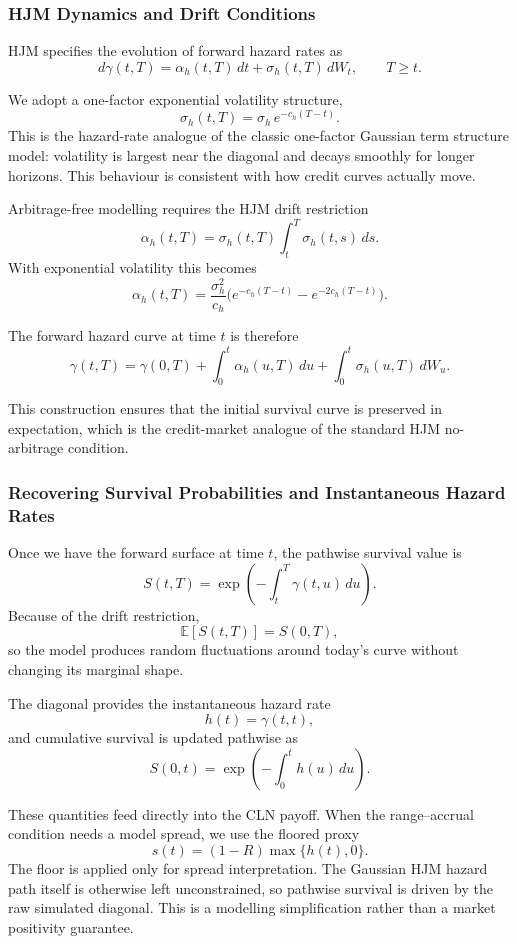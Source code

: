 \subsubsection*{HJM Dynamics and Drift Conditions}

HJM specifies the evolution of forward hazard rates as
\[
d\gamma(t,T)
= \alpha_h(t,T)\,dt + \sigma_h(t,T)\,dW_t,
\qquad T \ge t.
\]

We adopt a one-factor exponential volatility structure,
\[
\sigma_h(t,T) = \sigma_h\, e^{-c_h(T - t)}.
\]
This is the hazard-rate analogue of the classic one-factor Gaussian term
structure model: volatility is largest near the diagonal and decays smoothly for
longer horizons. This behaviour is consistent with how credit curves actually
move.

Arbitrage-free modelling requires the HJM drift restriction
\[
\alpha_h(t,T)
= \sigma_h(t,T)\int_t^T \sigma_h(t,s)\,ds.
\]
With exponential volatility this becomes
\[
\alpha_h(t,T)
  = \frac{\sigma_h^2}{c_h}\big(e^{-c_h(T - t)} - e^{-2c_h(T - t)}\big).
\]

The forward hazard curve at time $t$ is therefore
\[
\gamma(t,T)
= \gamma(0,T)
  + \int_0^t \alpha_h(u,T)\,du
  + \int_0^t \sigma_h(u,T)\,dW_u.
\]

This construction ensures that the initial survival curve is preserved in
expectation, which is the credit-market analogue of the standard HJM
no-arbitrage condition.

\subsubsection*{Recovering Survival Probabilities and Instantaneous Hazard Rates}

Once we have the forward surface at time $t$, the pathwise survival value is
\[
S(t,T)
  = \exp\!\left(-\int_t^T \gamma(t,u)\,du\right).
\]
Because of the drift restriction,
\[
\mathbb{E}\!\left[S(t,T)\right] = S(0,T),
\]
so the model produces random fluctuations around today’s curve without changing
its marginal shape.

The diagonal provides the instantaneous hazard rate
\[
h(t) = \gamma(t,t),
\]
and cumulative survival is updated pathwise as
\[
S(0,t) = \exp\!\left(-\int_0^t h(u)\,du\right).
\]

These quantities feed directly into the CLN payoff. When the range--accrual
condition needs a model spread, we use the floored proxy
\[
s(t) = (1 - R)\max\{h(t),0\}.
\]
The floor is applied only for spread interpretation. The Gaussian HJM hazard path
itself is otherwise left unconstrained, so pathwise survival is driven by the raw
simulated diagonal. This is a modelling simplification rather than a market
positivity guarantee.

